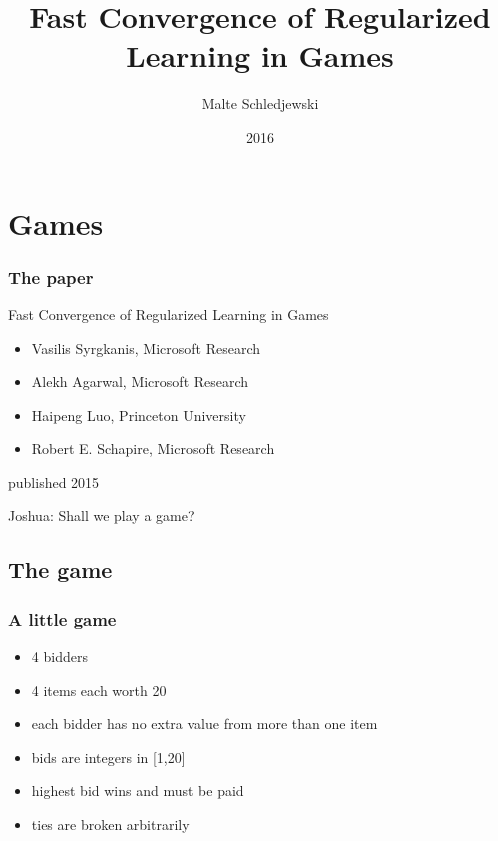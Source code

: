 \documentclass{beamer}
\title{Fast Convergence of Regularized Learning in Games}
\author{Malte Schledjewski}
\institute{Saarbrücken Graduate School of Computer Science}
\date{2016}
\begin{document}
	
\frame{\titlepage}

\section{Games}

\begin{frame}
	\frametitle{The paper}
	\begin{block}{Fast Convergence of Regularized Learning in Games}
		\begin{itemize}
			\item Vasilis Syrgkanis, Microsoft Research
			\item Alekh Agarwal, Microsoft Research
			\item Haipeng Luo, Princeton University
			\item Robert E. Schapire, Microsoft Research
		\end{itemize}
		published 2015
	\end{block}
\end{frame}


\begin{frame}[c]
	\begin{center}
		\Huge Joshua: Shall we play a game?
	\end{center}
\end{frame}

\subsection{The game}
\begin{frame}
	\frametitle{A little game}
	\begin{itemize}
		\item 4 bidders
		\item 4 items each worth 20
		\item each bidder has no extra value from more than one item
		\item bids are integers in [1,20]
		\item highest bid wins and must be paid
		\item ties are broken arbitrarily 
	\end{itemize}
\end{frame}
\end{document}
